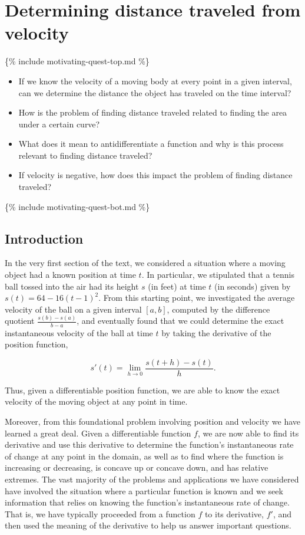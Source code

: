 \section{Determining distance traveled from
velocity}\label{S:4.1.VelocityDistance}

\{\% include motivating-quest-top.md \%\}

\begin{itemize}
\item
  If we know the velocity of a moving body at every point in a given
  interval, can we determine the distance the object has traveled on the
  time interval?
\item
  How is the problem of finding distance traveled related to finding the
  area under a certain curve?
\item
  What does it mean to antidifferentiate a function and why is this
  process relevant to finding distance traveled?
\item
  If velocity is negative, how does this impact the problem of finding
  distance traveled?
\end{itemize}

\{\% include motivating-quest-bot.md \%\}

\subsection*{Introduction}\label{introduction}

In the very first section of the text, we considered a situation where a
moving object had a known position at time \(t\). In particular, we
stipulated that a tennis ball tossed into the air had its height \(s\)
(in feet) at time \(t\) (in seconds) given by \(s(t) = 64 - 16(t-1)^2\).
From this starting point, we investigated the average velocity of the
ball on a given interval \([a,b]\), computed by the difference quotient
\(\frac{s(b)-s(a)}{b-a}\), and eventually found that we could determine
the exact instantaneous velocity of the ball at time \(t\) by taking the
derivative of the position function,

\[s'(t) = \lim_{h \to 0} \frac{s(t+h)-s(t)}{h}.\]

Thus, given a differentiable position function, we are able to know the
exact velocity of the moving object at any point in time.

Moreover, from this foundational problem involving position and velocity
we have learned a great deal. Given a differentiable function \(f\), we
are now able to find its derivative and use this derivative to determine
the function's instantaneous rate of change at any point in the domain,
as well as to find where the function is increasing or decreasing, is
concave up or concave down, and has relative extremes. The vast majority
of the problems and applications we have considered have involved the
situation where a particular function is known and we seek information
that relies on knowing the function's instantaneous rate of change. That
is, we have typically proceeded from a function \(f\) to its derivative,
\(f'\), and then used the meaning of the derivative to help us answer
important questions.

